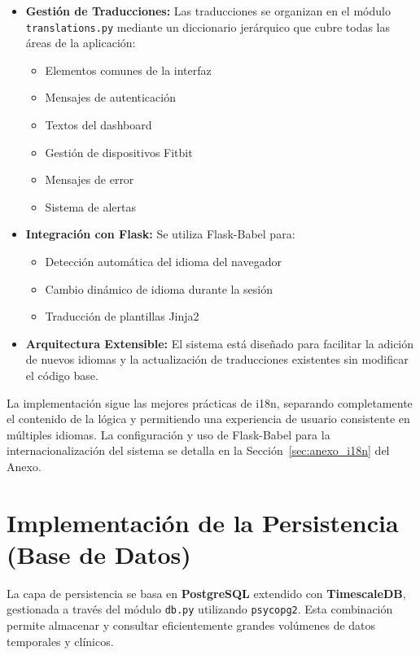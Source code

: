 \begin{itemize}
    \item \textbf{Gestión de Traducciones:} Las traducciones se organizan en el módulo \texttt{translations.py} mediante un diccionario jerárquico que cubre todas las áreas de la aplicación:
        \begin{itemize}
            \item Elementos comunes de la interfaz
            \item Mensajes de autenticación
            \item Textos del dashboard
            \item Gestión de dispositivos Fitbit
            \item Mensajes de error
            \item Sistema de alertas
        \end{itemize}
    \item \textbf{Integración con Flask:} Se utiliza Flask-Babel para:
        \begin{itemize}
            \item Detección automática del idioma del navegador
            \item Cambio dinámico de idioma durante la sesión
            \item Traducción de plantillas Jinja2
        \end{itemize}
    \item \textbf{Arquitectura Extensible:} El sistema está diseñado para facilitar la adición de nuevos idiomas y la actualización de traducciones existentes sin modificar el código base.
\end{itemize}

La implementación sigue las mejores prácticas de i18n, separando completamente el contenido de la lógica y permitiendo una experiencia de usuario consistente en múltiples idiomas. La configuración y uso de Flask-Babel para la internacionalización del sistema se detalla en la Sección~\ref{sec:anexo_i18n} del Anexo.

\section{Implementación de la Persistencia (Base de Datos)}
\label{sec:impl_persistencia}

La capa de persistencia se basa en \textbf{PostgreSQL} extendido con \textbf{TimescaleDB}, gestionada a través del módulo \texttt{db.py} utilizando \texttt{psycopg2}. Esta combinación permite almacenar y consultar eficientemente grandes volúmenes de datos temporales y clínicos.

